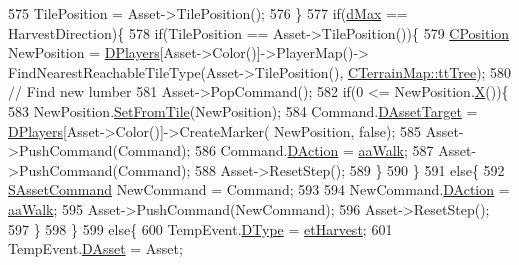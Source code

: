 \begin{DoxyCode}
575                 TilePosition = Asset->TilePosition();
576             \}
577             \textcolor{keywordflow}{if}(\hyperlink{GameDataTypes_8h_acb2b033915f6659a71a38b5aa6e4eb42af6546049275557ce0ade2ceee042a319}{dMax} == HarvestDirection)\{
578                 \textcolor{keywordflow}{if}(TilePosition == Asset->TilePosition())\{
579                     \hyperlink{classCPosition}{CPosition} NewPosition = \hyperlink{classCGameModel_a524436c3560b10e1c6d6fdd0b66565dc}{DPlayers}[Asset->Color()]->PlayerMap()->
      FindNearestReachableTileType(Asset->TilePosition(), \hyperlink{classCTerrainMap_aff2ab991e237269941416dd79d8871d4a15600fc22dc08ff5a3aec20930112f8c}{CTerrainMap::ttTree});
580                     \textcolor{comment}{// Find new lumber}
581                     Asset->PopCommand();
582                     \textcolor{keywordflow}{if}(0 <= NewPosition.\hyperlink{classCPosition_a9a6b94d3b91df1492d166d9964c865fc}{X}())\{
583                         NewPosition.\hyperlink{classCPosition_a46994e6a8b8e3b4237edd7259ad844b6}{SetFromTile}(NewPosition);
584                         Command.\hyperlink{structSAssetCommand_a3d9b43f6e59c386c48c41a65448a0c39}{DAssetTarget} = \hyperlink{classCGameModel_a524436c3560b10e1c6d6fdd0b66565dc}{DPlayers}[Asset->Color()]->CreateMarker(
      NewPosition, \textcolor{keyword}{false});
585                         Asset->PushCommand(Command);
586                         Command.\hyperlink{structSAssetCommand_a8edd3b3d59a76d5514ba403bc8076a75}{DAction} = \hyperlink{GameDataTypes_8h_ab47668e651a3032cfb9c40ea2d60d670a60ca9010aa62b73c1aab838ff4bf7276}{aaWalk};
587                         Asset->PushCommand(Command);
588                         Asset->ResetStep();
589                     \}
590                 \}
591                 \textcolor{keywordflow}{else}\{
592                     \hyperlink{structSAssetCommand}{SAssetCommand} NewCommand = Command;
593                     
594                     NewCommand.\hyperlink{structSAssetCommand_a8edd3b3d59a76d5514ba403bc8076a75}{DAction} = \hyperlink{GameDataTypes_8h_ab47668e651a3032cfb9c40ea2d60d670a60ca9010aa62b73c1aab838ff4bf7276}{aaWalk};
595                     Asset->PushCommand(NewCommand);
596                     Asset->ResetStep();
597                 \}
598             \}
599             \textcolor{keywordflow}{else}\{
600                 TempEvent.\hyperlink{structSGameEvent_afa10562e243f4ac2b473b655cc58fee7}{DType} = \hyperlink{GameModel_8h_abfcf510bafec7c6429906a6ecaac656da1e80f7847f187eaf3f313eab1807c66c}{etHarvest};
601                 TempEvent.\hyperlink{structSGameEvent_a40c85eeac83b96887b7449c9bdc5d624}{DAsset} = Asset;

\end{DoxyCode}
